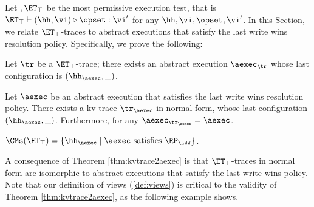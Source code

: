 Let $,\ET_\top$ be the most permissive execution test, that is 
$\ET_\top \vdash (\hh, \vi) \triangleright \opset: \vi'$ for any $\hh, \vi, \opset, \vi'$. 
In this Section, we relate $\ET_{\top}$-traces to abstract executions that satisfy the last write wins 
resolution policy. Specifically, we prove the following: 
\begin{theorem}
\label{thm:kvtrace2aexec}
Let $\tr$ be a $\ET_{\top}$-trace; there exists an abstract execution $\aexec_{\tr}$ 
whose last configuration is $(\hh_{\aexec}, \_)$.

Let $\aexec$ be an abstract execution that satisfies the last write wins resolution policy. 
There exists a kv-trace $\tr_{\aexec}$ in normal form, whose last configuration $(\hh_{\aexec}, \_)$. 
Furthermore, for any $\aexec_{\tr_{\aexec}} = \aexec$.
\end{theorem}

\begin{corollary} 
\label{cor:kvtrace2aexec}
$\CMs(\ET_{\top}) = \{\hh_{\aexec} \mid \aexec \text{ satisfies } \RP_{\LWW}\}$.
\end{corollary}

A consequence of Theorem \ref{thm:kvtrace2aexec} is that $\ET_{\top}$-traces in normal form are isomorphic 
to abstract executions that satisfy the last write wins policy.
Note that our definition of views (\cref{def:views}) is critical to the validity of Theorem \ref{thm:kvtrace2aexec}, 
as the following example shows. 

